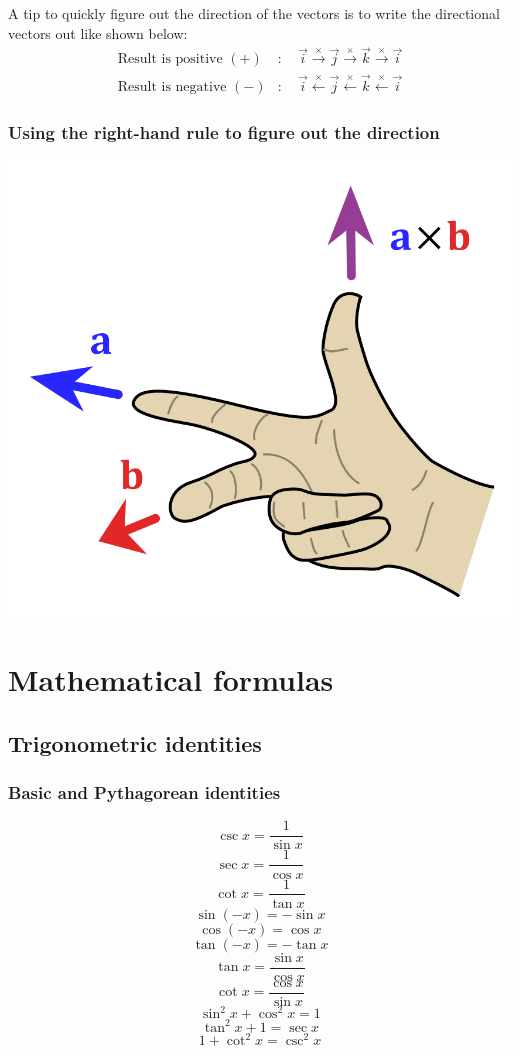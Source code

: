 \documentclass[11pt]{article}
\begin{document}
A tip to quickly figure out the direction of the vectors is to write the directional vectors out like shown below:
\begin{align*}
\text{Result is positive } (+) &: \quad \vec{i} \xrightarrow{\times} \vec{j} \xrightarrow{\times} \vec{k} \xrightarrow{\times} \vec{i} \\
\text{Result is negative } (-) &: \quad \vec{i} \xleftarrow{\times} \vec{j} \xleftarrow{\times} \vec{k} \xleftarrow{\times} \vec{i}
\end{align*}
\subsubsection{Using the right-hand rule to figure out the direction}
\label{sec:org3b5d927}
\begin{center}
\includegraphics[width=.9\linewidth]{./images/right-hand-rule-cross-product.png}
\end{center}

 \newpage
\section{Mathematical formulas}
\label{sec:orgedc17c6}

\subsection{Trigonometric identities}
\label{sec:org7dcf686}

\subsubsection{Basic and Pythagorean identities}
\label{sec:org102fcc5}
\[\csc x = \frac{1}{\sin x}\]
\[\sec x = \frac{1}{\cos x}\]
\[\cot x = \frac{1}{\tan x}\]
\[\sin (-x) = - \sin x\]
\[\cos (-x) = \cos x\]
\[\tan (-x) = - \tan x\]
\[\tan x = \frac{\sin x}{\cos x}\]
\[\cot x = \frac{\cos x}{\sin x}\]
\[\sin^2 x + \cos^2 x = 1\]
\[\tan^2 x + 1 = \sec x\]
\[1 + \cot^2 x = \csc^2 x\]
\end{document}
